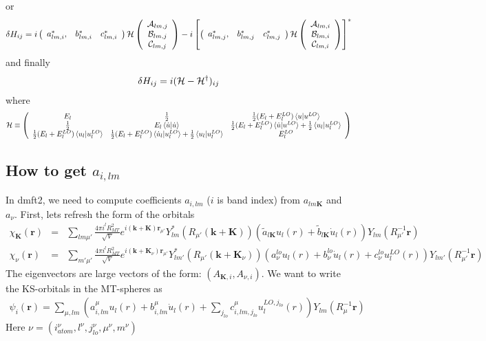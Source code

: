 \documentclass[aps,prb,floatfix,epsfig,singlecolumn,showpacs,preprintnumbers]{revtex4}
\renewcommand{\vr}{{\mathbf{r}}}
\newcommand{\vk}{{\mathbf{k}}}
\newcommand{\vK}{{\mathbf{K}}}
\newcommand{\cH}{{\cal H}}
\newcommand{\cA}{{\cal A}}
\newcommand{\cB}{{\cal B}}
\newcommand{\cC}{{\cal C}}
\begin{document}
or
\begin{eqnarray}
\delta H_{ij} =
i \left(
\begin{array}{ccc}
a_{lm,i}^*, & b_{lm,i}^* & c^*_{lm,i}
\end{array}
\right)
\cH
\left(
\begin{array}{c}
\cA_{lm,j}\\
\cB_{lm,j}\\ 
\cC_{lm,j}
\end{array}
\right)
-i \left[
\left(
\begin{array}{ccc}
a_{lm,j}^*, & b_{lm,j}^* & c^*_{lm,j}
\end{array}
\right)
\cH
\left(
\begin{array}{c}
\cA_{lm,i}\\
\cB_{lm,i}\\ 
\cC_{lm,i}
\end{array}
\right)
\right]^*
\end{eqnarray}
and finally
\begin{eqnarray}
\delta H_{ij} = i(\cH -\cH^\dagger)_{ij}
\end{eqnarray}
where
\begin{eqnarray}
\cH\equiv 
\left(
\begin{array}{ccc}
E_l & \frac{1}{2} & \frac{1}{2}(E_l+E^{LO}_l) \braket{u|u^{LO}} \\
\frac{1}{2} & E_l \braket{\dot{u}|\dot{u}} & \frac{1}{2}(E_l+E^{LO}_l) \braket{\dot{u}|u^{LO}}+ \frac{1}{2}\braket{u_l|u_l^{LO}}\\
\frac{1}{2}(E_l+E^{LO}_l) \braket{u_l|u^{LO}_l}&  \frac{1}{2}(E_l+E^{LO}_l) \braket{\dot{u}_l|u^{LO}_l}+\frac{1}{2}\braket{u_l|u_l^{LO}}& E^{LO}_l
\end{array}
\right)
\end{eqnarray}

\subsection{How to get $a_{i,lm}$}

In dmft2, we need to compute coefficients $a_{i,lm}$ ($i$ is band
index) from $a_{lm\vK}$ and $a_{\nu}$. First, lets refresh the form of
the orbitals
\begin{eqnarray}
\chi_\vK(\vr) &=& \sum_{lm\mu'} \frac{4\pi i^l R_{MT}^2}{\sqrt{V}}e^{i(\vk+\vK)\vr_{\mu'}}Y^*_{lm}(R_{\mu'}(\vk+\vK))  
 (\tilde{a}_{l\vK} u_l(r) + \tilde{b}_{l\vK}  \dot{u}_l(r))Y_{lm}(R_{\mu'}^{-1}\vr)\\
\chi_{\nu}(\vr) &=& \sum_{m'\mu'}\frac{4\pi i^l  R_{MT}^2}{\sqrt{V}}e^{i(\vk+\vK_\nu)\vr_{\mu'}}Y^*_{lm'}(R_{\mu'}(\vk+\vK_\nu))  
 (a^{lo}_{\nu} u_l(r) + b^{lo}_{\nu}\dot{u}_l(r) + c^{lo}_{\nu} u^{LO}_l(r)) Y_{lm'}(R_{\mu'}^{-1}\vr)
\end{eqnarray}
The eigenvectors are large vectors of the form:
$(A_{\vK,i},A_{\nu,i})$. We want to write the KS-orbitals in the
MT-spheres as
\begin{eqnarray}
\psi_{i}(\vr) = \sum_{\mu,lm} (a_{i,lm}^\mu u_l(r) + b_{i,lm}^\mu  \dot{u}_l(r)+\sum_{j_{lo}}c_{i,lm,j_{lo}}^\mu u^{LO,j_{lo}}_l(r)) Y_{lm}(R_{\mu}^{-1}\vr)
\end{eqnarray}
Here $\nu=(i_{atom}^\nu,l^\nu,j_{lo}^\nu,\mu^\nu,m^\nu)$
\end{document}
